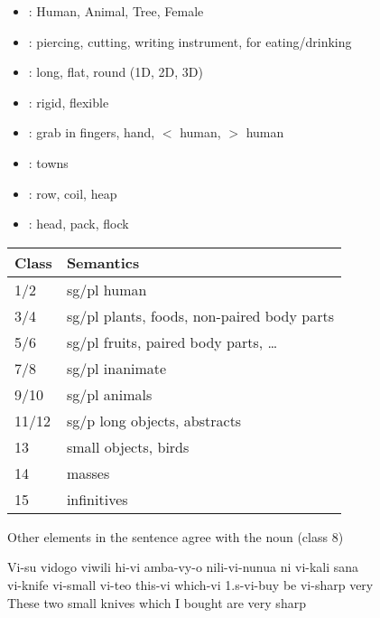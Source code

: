 \documentclass[headrule,footrule]{foils}
\begin{document}
\begin{itemize}
\item {}: Human, Animal, Tree, Female
\item {}: piercing, cutting, writing instrument, for eating/drinking
\item {}: long, flat, round (1D, 2D, 3D)
\item {}: rigid, flexible
\item {}: grab in fingers, hand, $<$ human, $>$ human
\item {}: towns
\item {}: row, coil, heap
\item {}: head, pack, flock
\end{itemize}


\begin{tabular}{ll}
  Class &  Semantics \\
\hline
1/2 	& sg/pl   human \\
3/4 	& sg/pl   plants, foods, non-paired body parts \\
5/6 	& sg/pl  fruits, paired body parts, \ldots \\
7/8 	& sg/pl  inanimate \\
9/10 	& sg/pl  animals \\
11/12 	& sg/p   long objects, abstracts \\
13      & small objects, birds \\
14      & masses \\
15      & infinitives
\end{tabular}
\newpage
Other elements in the sentence agree with the noun (class 8)
\begin{exe}
  \ex \gll Vi-su vidogo viwili hi-vi amba-vy-o nili-vi-nunua ni vi-kali sana \\
  vi-knife vi-small vi-teo this-vi which-vi 1.s-vi-buy be vi-sharp very \\
\trans These two small knives which I bought are very sharp
\end{exe}
\end{document}
